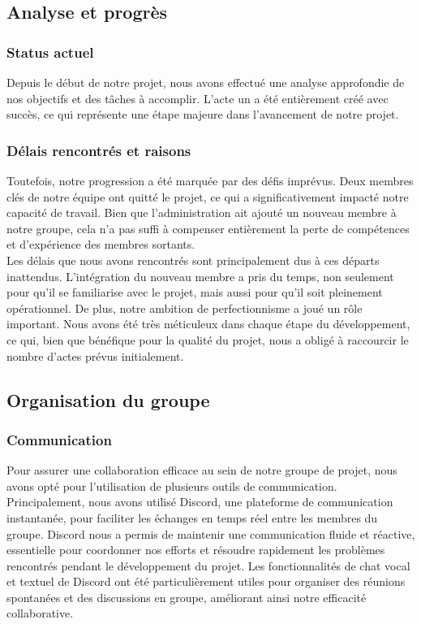 \subsection{Analyse et progrès}

\subsubsection{Status actuel}

Depuis le début de notre projet, nous avons effectué une analyse approfondie de nos objectifs et des tâches à accomplir. L'acte un a été entièrement créé avec succès, ce qui représente une étape majeure dans l'avancement de notre projet.  

\subsubsection{Délais rencontrés et raisons}

Toutefois, notre progression a été marquée par des défis imprévus. Deux membres clés de notre équipe ont quitté le projet, ce qui a significativement impacté notre capacité de travail. Bien que l'administration ait ajouté un nouveau membre à notre groupe, cela n'a pas suffi à compenser entièrement la perte de compétences et d'expérience des membres sortants. 
\\
 

Les délais que nous avons rencontrés sont principalement dus à ces départs inattendus. L'intégration du nouveau membre a pris du temps, non seulement pour qu'il se familiarise avec le projet, mais aussi pour qu'il soit pleinement opérationnel. De plus, notre ambition de perfectionnisme a joué un rôle important. Nous avons été très méticuleux dans chaque étape du développement, ce qui, bien que bénéfique pour la qualité du projet, nous a obligé à raccourcir le nombre d’actes prévus initialement. 
\subsection{Organisation du groupe}

\subsubsection{Communication}

Pour assurer une collaboration efficace au sein de notre groupe de projet, nous avons opté pour l'utilisation de plusieurs outils de communication. Principalement, nous avons utilisé Discord, une plateforme de communication instantanée, pour faciliter les échanges en temps réel entre les membres du groupe. Discord nous a permis de maintenir une communication fluide et réactive, essentielle pour coordonner nos efforts et résoudre rapidement les problèmes rencontrés pendant le développement du projet. Les fonctionnalités de chat vocal et textuel de Discord ont été particulièrement utiles pour organiser des réunions spontanées et des discussions en groupe, améliorant ainsi notre efficacité collaborative. 
\\

